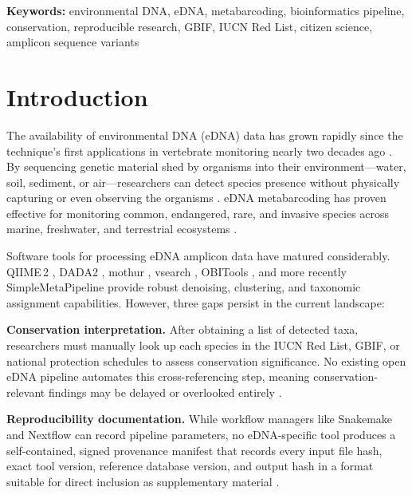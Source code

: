 \documentclass[11pt, a4paper]{article}
\begin{document}
\noindent\textbf{Keywords:} environmental DNA, eDNA, metabarcoding,
bioinformatics pipeline, conservation, reproducible research, GBIF,
IUCN Red List, citizen science, amplicon sequence variants

\vspace{1.5em}


\section{Introduction}

The availability of environmental DNA (eDNA) data has grown rapidly
since the technique's first applications in vertebrate monitoring
nearly two decades ago \citep{Ficetola2008}. By sequencing genetic
material shed by organisms into their environment---water, soil,
sediment, or air---researchers can detect species presence without
physically capturing or even observing the organisms
\citep{Taberlet2012, Deiner2017}. eDNA metabarcoding has proven
effective for monitoring common, endangered, rare, and invasive
species across marine, freshwater, and terrestrial ecosystems
\citep{Bonfil2021, Larson2020, Pfleger2016}.

Software tools for processing eDNA amplicon data have matured
considerably. QIIME\,2 \citep{Bolyen2019}, DADA2
\citep{Callahan2016}, mothur \citep{Schloss2011}, vsearch
\citep{Rognes2016}, OBITools \citep{Boyer2016}, and more recently
SimpleMetaPipeline \citep{Williams2024} provide robust denoising,
clustering, and taxonomic assignment capabilities. However, three
gaps persist in the current landscape:

\textbf{Conservation interpretation.} After obtaining a list of
detected taxa, researchers must manually look up each species in the
IUCN Red List, GBIF, or national protection schedules to assess
conservation significance. No existing open eDNA pipeline automates
this cross-referencing step, meaning conservation-relevant findings
may be delayed or overlooked entirely \citep{Lee2024}.

\textbf{Reproducibility documentation.} While workflow managers like
Snakemake and Nextflow can record pipeline parameters, no
eDNA-specific tool produces a self-contained, signed provenance
manifest that records every input file hash, exact tool version,
reference database version, and output hash in a format suitable for
direct inclusion as supplementary material \citep{Powers2019,
Sandve2013}.
\end{document}
